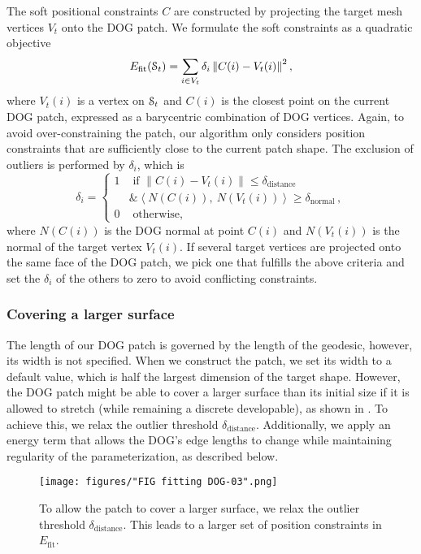 The soft positional constraints $ C $ are constructed by projecting the target mesh vertices  $ V_t $ onto the DOG patch. We formulate the soft constraints as a quadratic objective 
%
$$ 
E_{\text{fit}}(\mathcal{S}_t) = 
\sum_{i \in V_t} \delta_i \left\lVert C(i) - V_t(i)\right\rVert ^2,
$$
%
where $V_t(i)$ is a vertex on $ \mathcal{S}_t $ and $C(i)$ is the closest point on the current DOG patch, expressed as a barycentric combination of DOG vertices. 
Again, to avoid over-constraining the patch, our algorithm only considers position constraints that are sufficiently close to the current patch shape.
The exclusion of outliers is performed by $\delta_i$, which is
$$
\delta_i = \begin{cases}
	1 & \text{ if }  \left\lVert  C(i) - V_t(i) \right\rVert \leq  \delta_{\text{distance}} \\ 
	  & \&  \left\langle N({C(i)}),\ N({V_t(i)}) \right\rangle \geq  \delta_{\text{normal}}\,, \\ 
	0 & \text{ otherwise, }
\end{cases}
$$
where $N({C(i)})$ is the DOG normal at point $C(i)$ and $N({V_t(i)})$ is the normal of the target vertex $V_t(i)$. If several target vertices are projected onto the same face of the DOG patch, we pick one that fulfills the above criteria and set the $\delta_i$ of the others to zero to avoid conflicting constraints. 


\subsubsection{Covering a larger surface}

The length of our DOG patch is governed by the length of the geodesic, however, its width is not specified. When we construct the patch, we set its width to a default value, which is half the largest dimension of the target shape.
However, the DOG patch might be able to cover a larger surface than its initial size if it is allowed to stretch (while remaining a discrete developable), as shown in . 
To achieve this, we relax the outlier threshold $ \delta_{\text{distance}}$.
Additionally, we apply an energy term that allows the DOG's edge lengths to change while maintaining regularity of the parameterization, as described below.

\begin{figure} [h!]
\centering
\noindent\texttt{[image: figures/"FIG fitting DOG-03".png]}
\caption{
	To allow the patch to cover a larger surface, we relax the outlier threshold $ \delta_{\text{distance}} $. This leads to a larger set of position constraints in $ E_{\text{fit}} $.
	\label{fig:single_patch_stretching}}
\end{figure}


